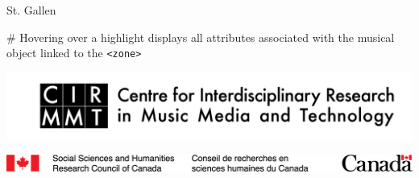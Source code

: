 \documentclass[final]{beamer}
\newcommand*{\xml}[1]{\small{\texttt{<#1>}}\normalsize}
\begin{document}
\begin{frame}[fragile,t]
\begin{minipage}[t][.8\textheight]{\textwidth}
\begin{columns}
\begin{column}{0.95\textwidth}
\begin{block}{}
\begin{columns}
\begin{column}{0.47\textwidth}
\begin{block}{St. Gallen}
\begin{easylist}[itemize]

    # Hovering over a highlight displays all attributes associated with the musical object linked to the \xml{zone}
                \end{easylist}
            \end{block}

            \vfill

            \begin{block}{}
                \centering
                \hspace{1.2cm} 
                \hspace{0.6cm} 
                \includegraphics[scale=0.2]{images/CIRMMT_logo}

                \includegraphics[scale=1.4]{images/SSHRC_logo}
                \vspace{0.8cm}


\end{block}
\end{column}
\end{columns}
\end{block}
\end{column}
\end{columns}
\end{minipage}
\end{frame}
\end{document}
